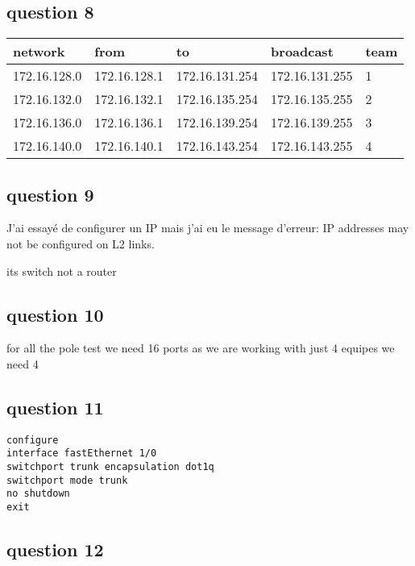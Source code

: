 \documentclass[11pt]{article}
\begin{document}
\subsection{question 8}
\label{sec:orgheadline24}

\begin{center}
\begin{tabular}{|l|l|l|l|l|}
\hline
network & from & to & broadcast & team \\
\hline
172.16.128.0 & 172.16.128.1 & 172.16.131.254 & 172.16.131.255 & 1 \\
\hline
172.16.132.0 & 172.16.132.1 & 172.16.135.254 & 172.16.135.255 & 2 \\
\hline
172.16.136.0 & 172.16.136.1 & 172.16.139.254 & 172.16.139.255 & 3 \\
\hline
172.16.140.0 & 172.16.140.1 & 172.16.143.254 & 172.16.143.255 & 4 \\
\hline
\end{tabular}
\end{center}

\subsection{question 9}
\label{sec:orgheadline25}

J'ai essayé de configurer un IP mais j'ai eu le message d'erreur:
IP addresses may not be configured on L2 links.

its switch not a router

\subsection{question 10}
\label{sec:orgheadline26}
for all the pole test we need 16 ports as we are working with just 4 equipes we need 4

\subsection{question 11}
\label{sec:orgheadline27}

\begin{verbatim}
configure
interface fastEthernet 1/0
switchport trunk encapsulation dot1q
switchport mode trunk
no shutdown
exit
\end{verbatim}



\subsection{question 12}
\label{sec:orgheadline28}
\end{document}
